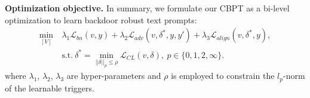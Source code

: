 \textbf{Optimization objective.}
In summary, we formulate our CBPT as a bi-level optimization to learn backdoor robust text prompts:
\begin{equation}
\begin{split}
    \mathop{\min}\limits_{[V]} \ &\lambda_1 \mathcal{L}_{bn}(v,y)+\lambda_2\mathcal{L}_{adv}(v, \delta^*, y, y')+\lambda_3\mathcal{L}_{align}(v, \delta^*, y), \\
    & \text{s.t.} \ \delta^*=\mathop{\min}\limits_{||\delta||_p \leq \rho} \mathcal{L}_{CL}(v, \delta),\ p \in \{0,1,2,\infty\}.
    \label{eq:general}
\end{split}
\end{equation}
where $\lambda_1$, $\lambda_2$, $\lambda_3$ are hyper-parameters and $\rho$ is employed to constrain the $l_p$-norm of the learnable triggers.

